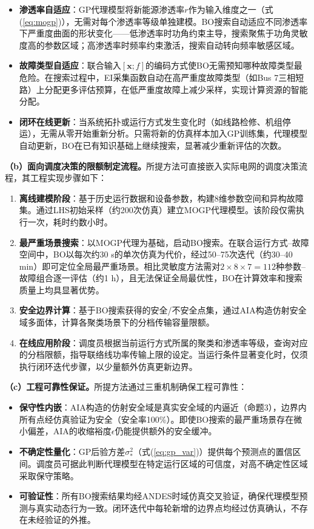 \documentclass[a4paper,11pt]{ctexart}
\newcommand{\bx}{\mathbf{x}}
\begin{document}
\begin{itemize}
    \item \textbf{渗透率自适应}：GP代理模型将新能源渗透率$r$作为输入维度之一（式(\ref{eq:mogp})），无需对每个渗透率等级单独建模。BO搜索自动适应不同渗透率下严重度曲面的形状变化——低渗透率时功角约束主导，搜索聚焦于功角灵敏度高的参数区域；高渗透率时频率约束激活，搜索自动转向频率敏感区域。
    \item \textbf{故障类型自适应}：联合输入$[\bx; f]$的编码方式使BO无需预知哪种故障类型最危险。在搜索过程中，EI采集函数自动在高严重度故障类型（如Bus 7三相短路）上分配更多评估预算，在低严重度故障上减少采样，实现计算资源的智能分配。
    \item \textbf{闭环在线更新}：当系统拓扑或运行方式发生变化时（如线路检修、机组停运），无需从零开始重新分析。只需将新的仿真样本加入GP训练集，代理模型自动更新，BO在已有知识基础上继续搜索，显著减少重新评估的次数。
\end{itemize}

\textbf{（b）面向调度决策的限额制定流程。}所提方法可直接嵌入实际电网的调度决策流程，其工程实现步骤如下：

\begin{enumerate}
    \item \textbf{离线建模阶段}：基于历史运行数据和设备参数，构建8维参数空间和异构故障集。通过LHS初始采样（约200次仿真）建立MOGP代理模型。该阶段仅需执行一次，耗时约数小时。
    \item \textbf{最严重场景搜索}：以MOGP代理为基础，启动BO搜索。在联合运行方式--故障空间中，BO以每次约30 s的单次仿真为代价，经过50--75次迭代（约30--40 min）即可定位全局最严重场景。相比灵敏度方法需对$2 \times 8 \times 7 = 112$种参数--故障组合逐一评估（约1 h），且无法保证全局最优性，BO在计算效率和搜索质量上均具显著优势。
    \item \textbf{安全边界计算}：基于BO搜索获得的安全/不安全点集，通过AIA构造仿射安全域多面体，计算各聚类场景下的分档传输容量限额。
    \item \textbf{在线应用阶段}：调度员根据当前运行方式所属的聚类和渗透率等级，查询对应的分档限额，指导联络线功率传输上限的设定。当运行条件显著变化时，仅须执行闭环迭代步骤，以少量额外仿真更新边界。
\end{enumerate}

\textbf{（c）工程可靠性保证。}所提方法通过三重机制确保工程可靠性：

\begin{itemize}
    \item \textbf{保守性内嵌}：AIA构造的仿射安全域是真实安全域的内逼近（命题3），边界内所有点经仿真验证为安全（安全率100\%）。即使BO搜索的最严重场景存在微小偏差，AIA的收缩裕度$\epsilon$仍能提供额外的安全缓冲。
    \item \textbf{不确定性量化}：GP后验方差$\sigma_*^2$（式(\ref{eq:gp_var})）提供每个预测点的置信区间。调度员可据此判断代理模型在特定运行区域的可信度，对高不确定性区域采取保守策略。
    \item \textbf{可验证性}：所有BO搜索结果均经ANDES时域仿真交叉验证，确保代理模型预测与真实动态行为一致。闭环迭代中每轮新增的边界点均经过仿真确认，不存在未经验证的外推。
\end{itemize}
\end{document}
